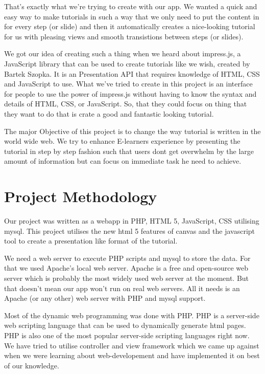 \documentclass[12pt,a4paper,titlepage]{article}
\begin{document}
That's exactly what we're trying to create with our app. We wanted a quick and easy way to make tutorials in such a way that we only need to put the content in for every step (or slide) and then it automatically creates a nice-looking tutorial for us with pleasing views and smooth transistions between steps (or slides).

We got our idea of creating such a thing when we heard about impress.js, a JavaScript library that can be used to create tutorials like we wish, created by Bartek Szopka. It is an Presentation API that requires knowledge of HTML, CSS and JavaScript to use. What we've tried to create in this project is an interface for people to use the power of impress.js without having to know the syntax and details of HTML, CSS, or JavaScript. So, that they could focus on thing that they want to do that is crate a good and fantastic looking tutorial.

The major Objective of this project is to change the way tutorial is written in the world wide web. We try to enhance E-learners experience by presenting the tutorial in step by step fashion such that users dont get overwhelm by the large amount of information but can focus on immediate task he need to achieve. 

\section{Project Methodology}

Our project was written as a webapp in PHP, HTML 5, JavaScript, CSS utilising mysql. This project utilises the new html 5 features of canvas and the javascript tool to create a presentation like format of the tutorial.

We need a web server to execute PHP scripts and mysql to store the data. For that we used Apache's local web server. Apache is a free and open-source web server which is probably the most widely used web server at the moment. But that doesn't mean our app won't run on real web servers. All it needs is an Apache (or any other) web server with PHP and mysql support.

Most of the dynamic web programming was done with PHP. PHP is a server-side web scripting language that can be used to dynamically generate html pages. PHP is also one of the most popular server-side scripting languages right now. We have tried to utilise controller and view framework which we came up against when we were learning about web-developement and have implemented it on best of our knowledge.
\end{document}
